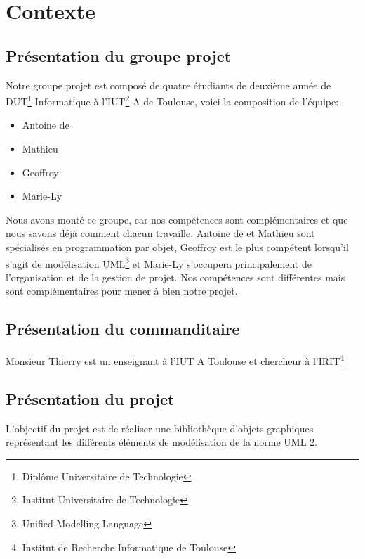 \documentclass[12pt,a4paper,openany]{article}
\begin{document}
	\maketitle
	\newpage
	\tableofcontents
	\newpage
	\section{Contexte}
	\subsection{Présentation du groupe projet}
	Notre groupe projet est composé de quatre étudiants de deuxième année de DUT\footnote{Diplôme Universitaire de Technologie} Informatique à l'IUT\footnote{Institut Universitaire de Technologie} A de Toulouse, voici la composition de l'équipe: 
	\begin{itemize}
		\item Antoine de  
		\item Mathieu  
		\item Geoffroy 
		\item Marie-Ly  
	\end{itemize}
	Nous avons monté ce groupe, car nos compétences sont complémentaires et que nous savons déjà comment chacun travaille. Antoine de  et Mathieu  sont spécialisés en programmation par objet, Geoffroy  est le plus compétent lorsqu'il s'agit de modélisation UML\footnote{Unified Modelling Language} et Marie-Ly  s'occupera principalement de l'organisation et de la gestion de projet. Nos compétences sont différentes mais sont complémentaires pour mener à bien notre projet.
		
	\subsection{Présentation du commanditaire}
	Monsieur Thierry  est un enseignant à l'IUT A Toulouse et chercheur à l'IRIT\footnote{Institut de Recherche Informatique de Toulouse}
	\subsection{Présentation du projet}
		L'objectif du projet est de réaliser une bibliothèque d'objets graphiques représentant les 
		différents éléments de modélisation de la norme UML 2.
\end{document}
